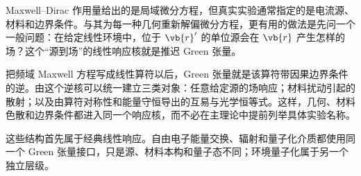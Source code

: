 Maxwell--Dirac 作用量给出的是局域微分方程，但真实实验通常指定的是电流源、材料和边界条件。与其为每一种几何重新解偏微分方程，更有用的做法是先问一个一般问题：在给定线性环境中，位于 $\vb{r}'$ 的单位源会在 $\vb{r}$ 产生怎样的场？这个“源到场”的线性响应核就是推迟 Green 张量。

把频域 Maxwell 方程写成线性算符以后，Green 张量就是该算符带因果边界条件的逆。由这个逆核可以统一建立三类对象：任意给定源的场响应；材料扰动引起的散射；以及由算符对称性和能量守恒导出的互易与光学恒等式。这样，几何、材料色散和边界条件都进入同一个响应核，而不必在主理论中提前列举具体实验名称。

这些结构首先属于经典线性响应。自由电子能量交换、辐射和量子化介质都使用同一个 Green 张量接口，只是源、材料本构和量子态不同；环境量子化属于另一个独立层级。






